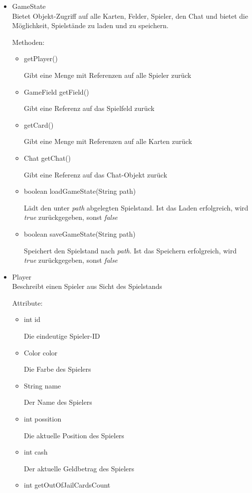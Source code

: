 \documentclass[a4paper,10pt]{article}
\begin{document}
\begin{itemize}

\item GameState\\
Bietet Objekt-Zugriff auf alle Karten, Felder, Spieler, den Chat und bietet die Möglichkeit, Spielstände zu laden und zu speichern.

Methoden:
\begin{itemize}
\item getPlayer()

Gibt eine Menge mit Referenzen auf alle Spieler zurück
\item GameField getField()

Gibt eine Referenz auf das Spielfeld zurück
\item getCard()

Gibt eine Menge mit Referenzen auf alle Karten zurück
\item Chat getChat()

Gibt eine Referenz auf das Chat-Objekt zurück
\item boolean loadGameState(String path)

Lädt den unter \textit{path} abgelegten Spielstand. Ist das Laden erfolgreich, wird \textit{true} zurückgegeben, sonst \textit{false}
\item boolean saveGameState(String path)

Speichert den Spielstand nach \textit{path}. Ist das Speichern erfolgreich, wird \textit{true} zurückgegeben, sonst \textit{false}
\end{itemize} %

\item Player \\
Beschreibt einen Spieler aus Sicht des Spielstands

Attribute:
\begin{itemize}
\item int id

Die eindeutige Spieler-ID
\item Color color

Die Farbe des Spielers
\item String name

Der Name des Spielers
\item int possition

Die aktuelle Position des Spielers
\item int cash

Der aktuelle Geldbetrag des Spielers
\item int getOutOfJailCardsCount


\end{itemize}
\end{itemize}
\end{document}
